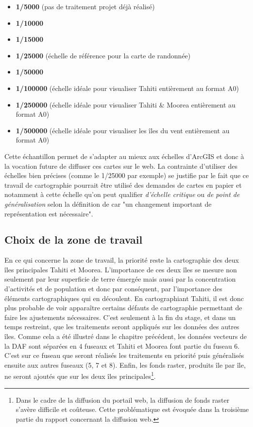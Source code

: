 \begin{itemize}
    \item \textbf{1/5000} (pas de traitement projet déjà réalisé)
    \item \textbf{1/10000}
    \item \textbf{1/15000}
    \item \textbf{1/25000} (échelle de référence pour la carte de randonnée)
    \item \textbf{1/50000}
    \item \textbf{1/100000} (échelle idéale pour visualiser Tahiti entièrement au format A0) 
    \item \textbf{1/250000} (échelle idéale pour visualiser Tahiti & Moorea entièrement au format A0)
    \item \textbf{1/500000}  (échelle idéale pour visualiser les îles du vent entièrement au format A0)
\end{itemize}
\vspace{0,3cm}
Cette échantillon permet de s'adapter au mieux aux échelles d'ArcGIS et donc à la vocation future de diffuser ces cartes sur le web. La contrainte  d'utiliser des échelles bien précises (comme le 1/25000 par exemple) se justifie par le fait que ce travail de cartographie pourrait être utilisé des demandes de cartes en papier et notamment à cette échelle qu'on peut qualifier \textit{d'échelle critique} ou \textit{de point de généralisation} selon la définition de \cite{Ratajski_1967} car "un changement important de représentation est nécessaire".

\subsection{Choix de la zone de travail}

En ce qui concerne la zone de travail, la priorité reste la cartographie des deux îles principales Tahiti et Moorea. L'importance de ces deux îles se mesure non seulement par leur superficie de terre émergée mais aussi par la concentration d'activités et de population et donc par conséquent, par l'importance des éléments cartographiques qui en découlent. En cartographiant Tahiti, il est donc plus probable de voir apparaître certains défauts de cartographie permettant de faire les ajustements nécessaires. C'est seulement à la fin du stage, et dans un temps restreint, que les traitements seront appliqués sur les données des autres îles.
Comme cela a été illustré dans le chapitre précédent, les données vecteurs de la DAF sont séparées en 4 fuseaux et Tahiti et Moorea font partie du fuseau 6. C'est sur ce fuseau que seront réalisés les traitements en priorité puis généralisés ensuite aux autres fuseaux (5, 7 et 8). Enfin, les fonds raster, produits île par île, ne seront ajoutés que sur les deux îles principales\footnote{Dans le cadre de la diffusion du portail web, la diffusion de fonds raster s'avère difficile et coûteuse. Cette problématique est évoquée dans la troisième partie du rapport concernant la diffusion web.}.


